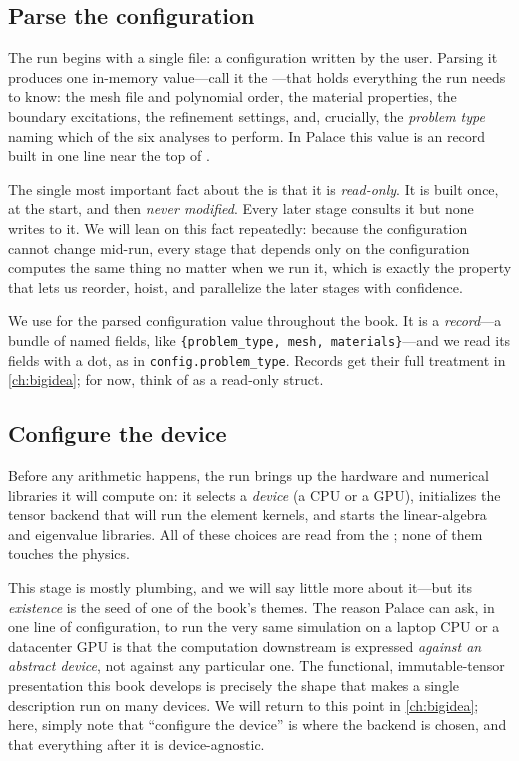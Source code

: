 \subsection{Parse the configuration}

The run begins with a single file: a configuration written by the user. Parsing
it produces one in-memory value---call it the ---that holds
everything the run needs to know: the mesh file and polynomial order, the
material properties, the boundary excitations, the refinement settings, and,
crucially, the \emph{problem type} naming which of the six analyses to perform.
In Palace this value is an  record built in one line near the top of
.

The single most important fact about the  is that it is
\emph{read-only}. It is built once, at the start, and then \emph{never modified}.
Every later stage consults it but none writes to it. We will lean on this fact
repeatedly: because the configuration cannot change mid-run, every stage that
depends only on the configuration computes the same thing no matter when we run
it, which is exactly the property that lets us reorder, hoist, and parallelize
the later stages with confidence.

\begin{notationbox}
We use  for the parsed configuration value throughout the book. It
is a \emph{record}---a bundle of named fields, like
\lstinline[style=l4style]|{problem_type, mesh, materials}|---and we read its
fields with a dot, as in \lstinline[style=l4style]|config.problem_type|. Records
get their full treatment in \cref{ch:bigidea}; for now, think of  as
a read-only struct.
\end{notationbox}

\subsection{Configure the device}

Before any arithmetic happens, the run brings up the hardware and numerical
libraries it will compute on: it selects a \emph{device} (a CPU or a GPU),
initializes the tensor backend that will run the element kernels, and starts the
linear-algebra and eigenvalue libraries. All of these choices are read from the
; none of them touches the physics.

This stage is mostly plumbing, and we will say little more about it---but its
\emph{existence} is the seed of one of the book's themes. The reason Palace can
ask, in one line of configuration, to run the very same simulation on a laptop
CPU or a datacenter GPU is that the computation downstream is expressed
\emph{against an abstract device}, not against any particular one. The functional,
immutable-tensor presentation this book develops is precisely the shape that
makes a single description run on many devices. We will return to this point in
\cref{ch:bigidea}; here, simply note that ``configure the device'' is where the
backend is chosen, and that everything after it is device-agnostic.

